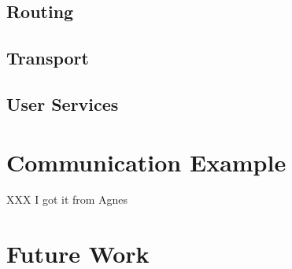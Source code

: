 \documentclass[12pt]{article}
\begin{document}
  \subsection{Routing}
  
  \subsection{Transport}
  
  \subsection{User Services}
  
  \section{Communication Example}
  
  XXX I got it from Agnes
  
  \section{Future Work}
\end{document}
